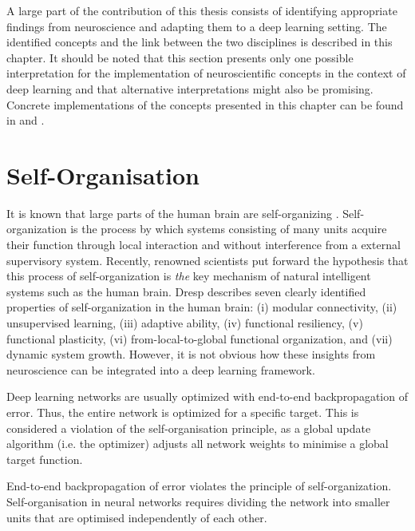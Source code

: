 A large part of the contribution of this thesis consists of identifying appropriate findings from neuroscience and adapting them to a deep learning setting.
The identified concepts and the link between the two disciplines is described in this chapter.
It should be noted that this section presents only one possible interpretation for the implementation of neuroscientific concepts in the context of deep learning and that alternative interpretations might also be promising.
Concrete implementations of the concepts presented in this chapter can be found in  and .


\section{Self-Organisation}
It is known that large parts of the human brain are self-organizing .
Self-organization is the process by which systems consisting of many units acquire their function through local interaction and without interference from a external supervisory system.
Recently, renowned scientists  put forward the hypothesis that this process of self-organization is \emph{the} key mechanism of natural intelligent systems such as the human brain.
Dresp  describes seven clearly identified properties of self-organization in the human brain: (i) modular connectivity, (ii) unsupervised learning, (iii) adaptive ability, (iv) functional resiliency, (v) functional plasticity, (vi) from-local-to-global functional organization, and (vii) dynamic system growth.
However, it is not obvious how these insights from neuroscience can be integrated into a deep learning framework.

Deep learning networks are usually optimized with end-to-end backpropagation of error.
Thus, the entire network is optimized for a specific target.
This is considered a violation of the self-organisation principle, as a global update algorithm (i.e. the optimizer) adjusts all network weights to minimise a global target function.


\begin{claim}
	End-to-end backpropagation of error violates the principle of self-organization. Self-organisation in neural networks requires dividing the network into smaller units that are optimised independently of each other.
\end{claim}

